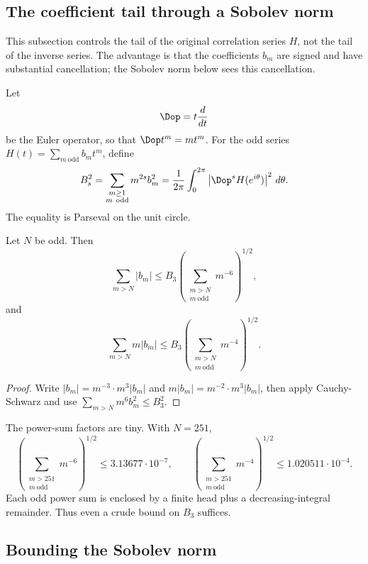 \subsection{The coefficient tail through a Sobolev norm}\label{sec:sobolev-tail}

This subsection controls the tail of the original correlation series $H$, not the tail of the inverse series.  The advantage is that the coefficients $b_m$ are signed and have substantial cancellation; the Sobolev norm below sees this cancellation.

Let
\[
  \Dop=t{d\over dt}
\]
be the Euler operator, so that $\Dop t^m=mt^m$.  For the odd series $H(t)=\sum_{m\ \mathrm{odd}}b_mt^m$, define
\begin{equation}\label{eq:B-s}
  B_s^2=\sum_{\substack{m\ge1\\m\ \mathrm{odd}}}m^{2s}b_m^2
  ={1\over2\pi}\int_0^{2\pi}\left|\Dop^sH(e^{i\theta})\right|^2\,d\theta.
\end{equation}
The equality is Parseval on the unit circle.

\begin{lemma}\label{lem:sobolev-tail}
Let $N$ be odd.  Then
\[
  \sum_{m>N}|b_m|\le B_3\left(\sum_{\substack{m>N\\m\ \mathrm{odd}}}m^{-6}\right)^{1/2},
\]
and
\[
  \sum_{m>N}m|b_m|\le B_3\left(\sum_{\substack{m>N\\m\ \mathrm{odd}}}m^{-4}\right)^{1/2}.
\]
\end{lemma}

\begin{proof}
Write $|b_m|=m^{-3}\cdot m^3|b_m|$ and $m|b_m|=m^{-2}\cdot m^3|b_m|$, then apply Cauchy-Schwarz and use $\sum_{m>N}m^6b_m^2\le B_3^2$.
\end{proof}

The power-sum factors are tiny.  With $N=251$,
\begin{equation}\label{eq:tail-factors}
  \left(\sum_{\substack{m>251\\m\ \mathrm{odd}}}m^{-6}\right)^{1/2}\le3.13677\cdot10^{-7},
  \qquad
  \left(\sum_{\substack{m>251\\m\ \mathrm{odd}}}m^{-4}\right)^{1/2}\le1.020511\cdot10^{-4}.
\end{equation}
Each odd power sum is enclosed by a finite head plus a decreasing-integral remainder.  Thus even a crude bound on $B_3$ suffices.



\subsection{Bounding the Sobolev norm}\label{sec:sobolev-norm}

